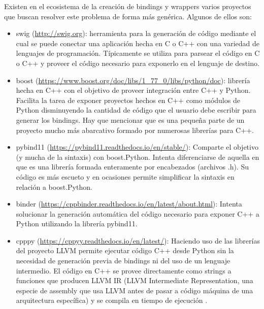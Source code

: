 Existen en el ecosistema de la creación de bindings y wrappers varios proyectos
que buscan resolver este problema de forma más genérica. Algunos de ellos son:

\begin{itemize}
    \item swig (\url{http://swig.org}): herramienta para la generación de
    código mediante el cual se puede conectar una aplicación hecha en C o C++
    con una variedad de lenguajes de programación. Típicamente se utiliza para
    parsear el código en C o C++ y proveer el código necesario para exponerlo
    en el lenguaje de destino.

    \item boost
    (\url{https://www.boost.org/doc/libs/1_77_0/libs/python/doc}):
    librería hecha en C++ con el objetivo de proveer integración entre C++ y
    Python. Facilita la tarea de exponer proyectos hechos en C++ como módulos
    de Python disminuyendo la cantidad de código que el usuario debe escribir
    para generar los bindings. Hay que mencionar que es una pequeña parte de un
    proyecto mucho más abarcativo formado por numerosas librerías para C++.

    \item pybind11 (\url{https://pybind11.readthedocs.io/en/stable/}): Comparte
    el objetivo (y mucha de la sintaxis) con boost.Python.  Intenta
    diferenciarse de aquella en que es una librería formada enteramente por
    encabezados (archivos .h). Su código es más escueto y en ocasiones permite
    simplificar la sintaxis en relación a boost.Python. 

    \item binder (\url{https://cppbinder.readthedocs.io/en/latest/about.html}):
    Intenta solucionar la generación automática del código necesario para
    exponer C++ a Python utilizando la librería pybind11.

    \item cpppy (\url{https://cppyy.readthedocs.io/en/latest/}): Haciendo uso
    de las librerías del proyecto LLVM permite ejecutar código C++ desde Python
    sin la necesidad de generación previa de bindings ni del uso de un lenguaje
    intermedio. El código en C++ se provee directamente como strings a
    funciones que producen LLVM IR (LLVM Intermediate Representation, una
    especie de assembly que usa LLVM antes de pasar a código máquina de una
    arquitectura específica) y se compila en tiempo de ejecución
    \cite{lavrijsen}.
\end{itemize}

